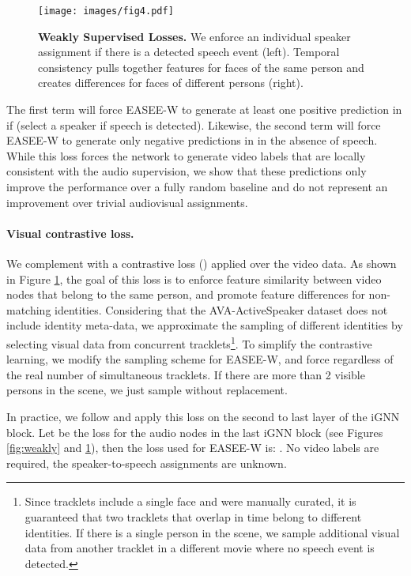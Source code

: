 \documentclass[10pt,twocolumn,letterpaper]{article}
\begin{document}
 \begin{figure}[t]
    \begin{center}
        \texttt{[image: images/fig4.pdf]}        
    \end{center}
    \caption{
        \textbf{Weakly Supervised Losses.} We enforce an individual speaker assignment if there is a detected speech event (left). Temporal consistency pulls together features for faces of the same person and creates differences for faces of different persons (right).
    }
    \label{fig:VCL}
\end{figure} 
The first term  will force EASEE-W to generate at least one positive prediction in  if  (\ie select a speaker if speech is detected). Likewise, the second term  will force EASEE-W to generate only negative predictions in  in the absence of speech. While this loss forces the network to generate video labels that are locally consistent with the audio supervision, we show that these predictions only improve the performance over a fully random baseline and do not represent an improvement over trivial audiovisual assignments. 

\paragraph{Visual contrastive loss.} We complement  with a contrastive loss () applied over the video data. As shown in Figure \ref{fig:VCL}, the goal of this loss is to enforce feature similarity between video nodes that belong to the same person, and promote feature differences for non-matching identities. Considering that the AVA-ActiveSpeaker dataset \cite{roth2020ava} does not include identity meta-data, we approximate the sampling of different identities by selecting visual data from concurrent tracklets\footnote{Since tracklets include a single face and were manually curated, it is guaranteed that two tracklets that overlap in time belong to different identities. If there is a single person in the scene, we sample additional visual data from another tracklet in a different movie where no speech event is detected.}. To simplify the contrastive learning, we modify the sampling scheme for EASEE-W, and force  regardless of the real number of simultaneous tracklets. If there are more than 2 visible persons in the scene, we just sample without replacement.

In practice, we follow \cite{chen2020simple} and apply this loss on the second to last layer of the iGNN block. Let  be the loss for the audio nodes in the last iGNN block (see Figures \ref{fig:weakly} and \ref{fig:VCL}), then the loss used for EASEE-W is: . No video labels are required, \ie the speaker-to-speech assignments are unknown.
\end{document}
